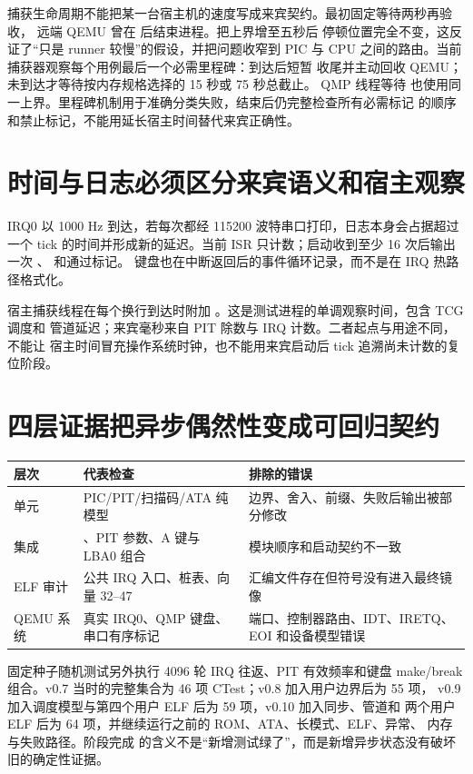捕获生命周期不能把某一台宿主机的速度写成来宾契约。最初固定等待两秒再验收，
远端 QEMU 曾在  后结束进程。把上界增至五秒后
停顿位置完全不变，这反证了“只是 runner 较慢”的假设，并把问题收窄到 PIC
与 CPU 之间的路由。当前捕获器观察每个用例最后一个必需里程碑：到达后短暂
收尾并主动回收 QEMU；未到达才等待按内存规格选择的 15 秒或 75 秒总截止。
QMP 线程等待 
也使用同一上界。里程碑机制用于准确分类失败，结束后仍完整检查所有必需标记
的顺序和禁止标记，不能用延长宿主时间替代来宾正确性。

\section{时间与日志必须区分来宾语义和宿主观察}

IRQ0 以 1000 Hz 到达，若每次都经 115200 波特串口打印，日志本身会占据超过
一个 tick 的时间并形成新的延迟。当前 ISR 只计数；启动收到至少 16 次后输出
一次 、 和通过标记。
键盘也在中断返回后的事件循环记录，而不是在 IRQ 热路径格式化。

宿主捕获线程在每个换行到达时附加
\code{[QEMU][T+000123ms]}。这是测试进程的单调观察时间，包含 TCG 调度和
管道延迟；来宾毫秒来自 PIT 除数与 IRQ 计数。二者起点与用途不同，不能让
宿主时间冒充操作系统时钟，也不能用来宾启动后 tick 追溯尚未计数的复位阶段。

\section{四层证据把异步偶然性变成可回归契约}

\begin{longtable}{L{0.18\textwidth}L{0.28\textwidth}L{0.42\textwidth}}
\toprule
层次 & 代表检查 & 排除的错误\\
\midrule
单元 & PIC/PIT/扫描码/ATA 纯模型 &
边界、舍入、前缀、失败后输出被部分修改\\
集成 & 、PIT 参数、A 键与 LBA0 组合 &
模块顺序和启动契约不一致\\
ELF 审计 & 公共 IRQ 入口、桩表、向量 32--47 &
汇编文件存在但符号没有进入最终镜像\\
QEMU 系统 & 真实 IRQ0、QMP 键盘、串口有序标记 &
端口、控制器路由、IDT、IRETQ、EOI 和设备模型错误\\
\bottomrule
\end{longtable}

固定种子随机测试另外执行 4096 轮 IRQ 往返、PIT 有效频率和键盘 make/break
组合。v0.7 当时的完整集合为 46 项 CTest；v0.8 加入用户边界后为 55 项，
v0.9 加入调度模型与第四个用户 ELF 后为 59 项，v0.10 加入同步、管道和
两个用户 ELF 后为 64 项，并继续运行之前的 ROM、ATA、长模式、ELF、异常、
内存与失败路径。阶段完成
的含义不是“新增测试绿了”，而是新增异步状态没有破坏旧的确定性证据。

